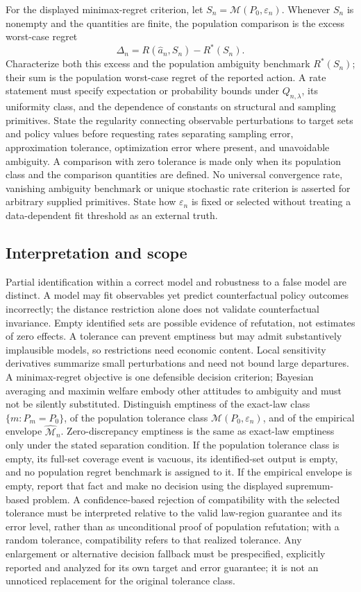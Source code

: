 \documentclass[11pt,a4paper]{article}
\begin{document}
For the displayed minimax-regret criterion, let $S_n=\mathcal M(P_0,\varepsilon_n)$. Whenever $S_n$ is nonempty and the quantities are finite, the population comparison is the excess worst-case regret
\[
\Delta_n=R(\widehat a_n,S_n)-R^*(S_n).
\]
Characterize both this excess and the population ambiguity benchmark $R^*(S_n)$; their sum is the population worst-case regret of the reported action. A rate statement must specify expectation or probability bounds under $Q_{n,\lambda}$, its uniformity class, and the dependence of constants on structural and sampling primitives. State the regularity connecting observable perturbations to target sets and policy values before requesting rates separating sampling error, approximation tolerance, optimization error where present, and unavoidable ambiguity. A comparison with zero tolerance is made only when its population class and the comparison quantities are defined. No universal convergence rate, vanishing ambiguity benchmark or unique stochastic rate criterion is asserted for arbitrary supplied primitives. State how $\varepsilon_n$ is fixed or selected without treating a data-dependent fit threshold as an external truth.

\subsection*{Interpretation and scope}

Partial identification within a correct model and robustness to a false model are distinct. A model may fit observables yet predict counterfactual policy outcomes incorrectly; the distance restriction alone does not validate counterfactual invariance. Empty identified sets are possible evidence of refutation, not estimates of zero effects. A tolerance can prevent emptiness but may admit substantively implausible models, so restrictions need economic content. Local sensitivity derivatives summarize small perturbations and need not bound large departures. A minimax-regret objective is one defensible decision criterion; Bayesian averaging and maximin welfare embody other attitudes to ambiguity and must not be silently substituted. Distinguish emptiness of the exact-law class $\{m:P_m=P_0\}$, of the population tolerance class $\mathcal M(P_0,\varepsilon_n)$, and of the empirical envelope $\widehat{\mathcal M}_n$. Zero-discrepancy emptiness is the same as exact-law emptiness only under the stated separation condition. If the population tolerance class is empty, its full-set coverage event is vacuous, its identified-set output is empty, and no population regret benchmark is assigned to it. If the empirical envelope is empty, report that fact and make no decision using the displayed supremum-based problem. A confidence-based rejection of compatibility with the selected tolerance must be interpreted relative to the valid law-region guarantee and its error level, rather than as unconditional proof of population refutation; with a random tolerance, compatibility refers to that realized tolerance. Any enlargement or alternative decision fallback must be prespecified, explicitly reported and analyzed for its own target and error guarantee; it is not an unnoticed replacement for the original tolerance class.
\end{document}
